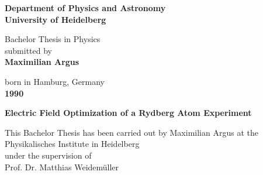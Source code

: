 \documentclass[a4paper,titlepage]{report}
\begin{document}
\begin{titlepage}

\begin{center}
 
\Large\textbf{Department of Physics and Astronomy\\
University of Heidelberg}


\vspace{16cm}

\normalsize
Bachelor Thesis in Physics\\
submitted by\\
\vspace{0.5cm}
\Large\textbf{Maximilian Argus}\\
\normalsize
\vspace{0.5cm}

born in Hamburg, Germany\\
\vspace{0.5cm}
\Large\textbf{1990}
\normalsize

\newpage




\Large\textbf{Electric Field Optimization of a Rydberg Atom Experiment}

\vspace{18cm}

\normalsize
This Bachelor Thesis has been carried out by Maximilian Argus at the\\
Physikalisches Institute in Heidelberg\\
under the supervision of\\
Prof. Dr. Matthias Weidem\"uller

\vfill
\end{center}

\end{titlepage}
\end{document}
